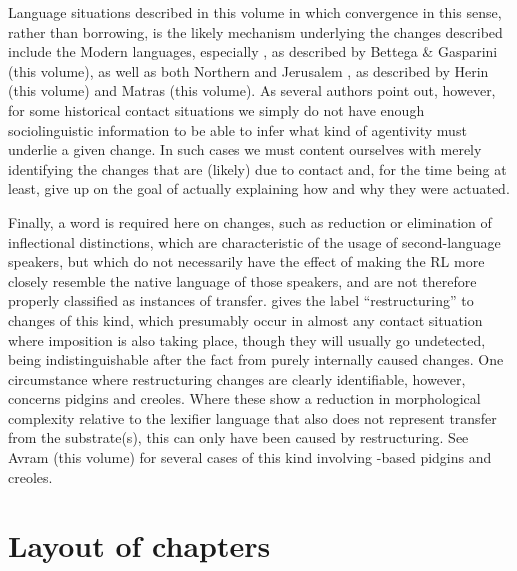 \documentclass[output=paper]{langsci/langscibook}
\begin{document}
Language situations described in this volume in which {convergence} in this sense, rather than borrowing, is the likely mechanism underlying the changes described include the Modern  languages, especially , as described by Bettega \& Gasparini (this volume), as well as both Northern and Jerusalem , as described by Herin (this volume) and Matras (this volume). As several authors point out, however, for some historical contact situations we simply do not have enough sociolinguistic information to be able to infer what kind of agentivity must underlie a given change. In such cases we must content ourselves with merely identifying the changes that are (likely) due to contact and, for the time being at least, give up on the goal of actually explaining how and why they were {actuated}.

Finally, a word is required here on changes, such as reduction or elimination of {inflectional} distinctions, which are characteristic of the usage of second-language speakers, but which do not necessarily have the effect of making the {RL} more closely resemble the native language of those speakers, and are not therefore properly classified as instances of {transfer}. \citet{Lucas2015} gives the label ``restructuring'' to changes of this kind, which presumably occur in almost any contact situation where {imposition} is also taking place, though they will usually go undetected, being indistinguishable after the fact from purely internally caused changes. One circumstance where restructuring changes are clearly identifiable, however, concerns pidgins and creoles. Where these show a reduction in morphological complexity {relative} to the {lexifier} language that also does not represent {transfer} from the {substrate}(s), this can only have been caused by restructuring. See Avram (this volume) for several cases of this kind involving -based pidgins and creoles.

\section{Layout of chapters}\label{introstructure}
\end{document}
